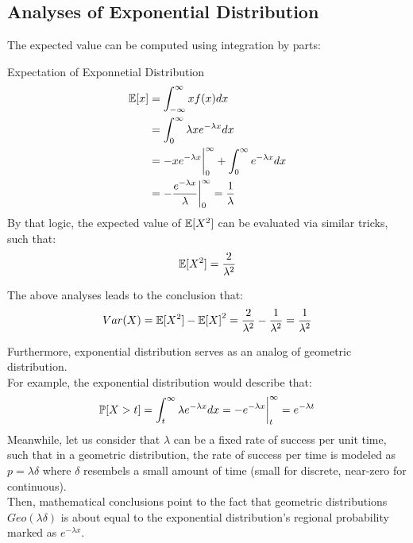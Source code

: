 \subsection{Analyses of Exponential Distribution}
The expected value can be computed using integration by parts:
\begin{ln-define}{Expectation of Exponnetial Distribution}{}
    \begin{align*}
        \E[x] &= \int_{-\infty}^{\infty} x f(x) dx \\
        &= \int_0^{\infty} \lambda x e^{-\lambda x} dx \\
        &= -x e^{-\lambda x} {\bigg|}_0^{\infty} + \int_0^{\infty} e^{-\lambda x} dx \\
        &= -\frac{e^{-\lambda x}}{\lambda} {\bigg|}_0^{\infty} = \frac{1}{\lambda}
    \end{align*}
    By that logic, the expected value of $\E[X^2]$ can be evaluated via similar tricks, such that:
    \[\E[X^2] = \frac{2}{\lambda^2}\]
\end{ln-define}
The above analyses leads to the conclusion that:
\[Var(X) = \E[X^2] - {\E[X]}^2 = \frac{2}{\lambda^2} - \frac{1}{\lambda^2} = \frac{1}{\lambda^2}\]

Furthermore, exponential distribution serves as an analog of geometric distribution. \\
For example, the exponential distribution would describe that:
\[
    \P[X > t] = \int_t^{\infty} \lambda e^{-\lambda x} dx = -e^{-\lambda x} {\bigg|}_t^{\infty} = e^{-\lambda t}
\]
Meanwhile, let us consider that $\lambda$ can be a fixed rate of success per unit time, such that in a geometric distribution, the rate of success per time is modeled as $p = \lambda \delta$ where $\delta$ resembels a small amount of time (small for discrete, near-zero for continuous). \\
Then, mathematical conclusions point to the fact that geometric distributions $Geo(\lambda \delta)$ is about equal to the exponential distribution's regional probability marked as $e^{-\lambda x}$.

